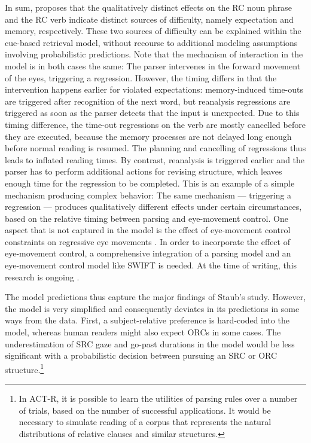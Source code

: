 \documentclass{cambridge7A}\usepackage[]{graphicx}\usepackage[]{color}
\begin{document}
In sum, \cite{Staub2010a} proposes that the qualitatively distinct effects on the RC noun phrase and the RC verb indicate distinct sources of difficulty, namely expectation and memory, respectively. These two sources of difficulty can be explained within the cue-based retrieval model, without recourse to additional modeling assumptions involving probabilistic predictions. Note that the mechanism of interaction in the model is in both cases the same: The parser intervenes in the forward movement of the eyes, triggering a regression. However, the timing differs in that the intervention happens earlier for violated expectations: memory-induced time-outs are triggered after recognition of the next word, but reanalysis regressions are triggered as soon as the parser detects that the input is unexpected. Due to this timing difference, the time-out regressions on the verb are mostly cancelled before they are executed, because the memory processes are not delayed long enough before normal reading is resumed. The planning and cancelling of regressions thus leads to inflated reading times. By contrast, reanalysis is triggered earlier and the parser has to perform additional actions for revising structure, which leaves enough time for the regression to be completed. 
This is an example of a simple mechanism producing complex behavior: The same mechanism --- triggering a regression ---  produces qualitatively different effects under certain circumstances, based on the relative timing between parsing and eye-movement control. One aspect that is not captured in the model is the effect of eye-movement control constraints on regressive eye movements \citep{EngbertNuthmannRichter2005}. In order to incorporate the effect of eye-movement control, a comprehensive integration of a parsing model and an eye-movement control model like SWIFT is needed. At the time of writing, this research is ongoing \citep{Rabe2019}.

The model predictions thus capture the major findings of Staub's study. However, the model is very simplified and consequently deviates in its predictions in some ways from the data.
First, a subject-relative preference is hard-coded into the model, whereas human readers might also expect ORCs in some cases. The underestimation of SRC gaze and go-past durations in the model would be less significant with a probabilistic decision between pursuing an SRC or ORC structure.\footnote{In ACT-R, it is possible to learn the utilities of parsing rules over a number of trials, based on the number of successful applications. It would be necessary to simulate reading of a corpus that represents the natural distributions of relative clauses and similar structures.}
\end{document}
